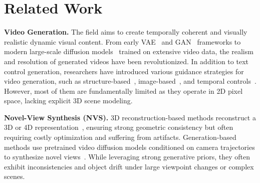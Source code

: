 

\section{Related Work}

\noindent\textbf{Video Generation.} The field aims to create temporally coherent and visually realistic dynamic visual content. From early VAE~\cite{vqvae,DBLP:conf/icml/DentonF18,he2018probabilistic,babaeizadeh2021fitvid,4dfy} and GAN~\cite{DBLP:conf/nips/VondrickPT16,tulyakov2018mocogan,clark2019adversarial} frameworks to modern large-scale diffusion models~\cite{VDM,make-a-video,khachatryan2023text2video,wan2025wan,kling} trained on extensive video data, the realism and resolution of generated videos have been revolutionized. In addition to text control generation, researchers have introduced various guidance strategies for video generation, such as structure-based~\cite{ma2024follow,xing2024make,chen2025echomimic}, image-based~\cite{chen2023videocrafter1,deng2024autoregressive}, and temporal controls~\cite{shi2024motion,wu2024motionbooth,yang2024direct}. However, most of them are fundamentally limited as they operate in 2D pixel space, lacking explicit 3D scene modeling. 

\vspace{4pt}
\noindent\textbf{Novel-View Synthesis (NVS).}
3D reconstruction-based methods reconstruct a 3D or 4D representation~\cite{4dgs,zhou2023nerflix,zhu2024fsgs,charatan2024pixelsplat}, ensuring strong geometric consistency but often requiring costly optimization and suffering from artifacts. Generation-based methods use pretrained video diffusion models conditioned on camera trajectories to synthesize novel views~\cite{Reconx,viewcrafter,cat3d,muller2024multidiff,bai2025recammaster}. While leveraging strong generative priors, they often exhibit inconsistencies and object drift under large viewpoint changes or complex scenes. 


